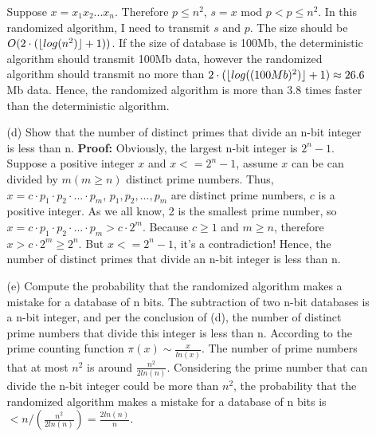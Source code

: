 \documentclass{article}       %
\DeclarePairedDelimiter\floor{\lfloor}{\rfloor}
\begin{document}
\begin{enumerate}
\begin{enumerate}
		Suppose $x = x_1x_2 ... x_n$. Therefore $p \leq n^2$, $s = x$ mod $p < p \leq n^2$. In this randomized algorithm, I need to transmit $s$ and $p$. The size should be $O(2 \cdot (\floor{log(n^2)} + 1))$.\newline
		If the size of database is 100Mb, the deterministic algorithm should transmit 100Mb data, however the randomized algorithm should transmit no more than $2 \cdot (\floor{log((100Mb)^2)} + 1) \approx 26.6$Mb data.\newline
		Hence, the randomized algorithm is more than $3.8$ times faster than the deterministic algorithm.\newline
		\item[(d)] Show that the number of distinct primes that divide an n-bit integer is less than n.\newline\newline
		\textbf{Proof:} Obviously, the largest n-bit integer is $2^n - 1$. Suppose a positive integer $x$ and $x <= 2^n -1$, assume $x$ can be can divided by $m (m \geq n)$ distinct prime numbers.\newline
		Thus, $x = c \cdot p_1 \cdot p_2 \cdot ... \cdot p_m$, $p_1, p_2, ..., p_m$ are distinct prime numbers, $c$ is a positive integer. As we all know, 2 is the smallest prime number, so $x = c \cdot p_1 \cdot p_2 \cdot ... \cdot p_m > c \cdot 2^m$. Because $c \geq 1$ and $m \geq n$, therefore $x > c \cdot 2^m \geq 2^n$. But $x <= 2^n-1$, it's a contradiction!\newline
		Hence, the number of distinct primes that divide an n-bit integer is less than n.\newline
		\item[(e)] Compute the probability that the randomized algorithm makes a mistake for a database of n bits.\newline\newline
		The subtraction of two n-bit databases is a n-bit integer, and per the conclusion of (d), the number of distinct prime numbers that divide this integer is less than n.\newline
		According to the prime counting function $\pi (x) \sim \frac{x}{ln(x)}$. The number of prime numbers that at most $n^2$ is around $\frac{n^2}{2ln(n)}$.\newline
		Considering the prime number that can divide the n-bit integer could be more than $n^2$, the probability that the randomized algorithm makes a mistake for a database of n bits is $< n / (\frac{n^2}{2ln(n)}) = \frac{2ln(n)}{n}$.\newline
		

\end{enumerate}
\end{enumerate}
\end{document}
